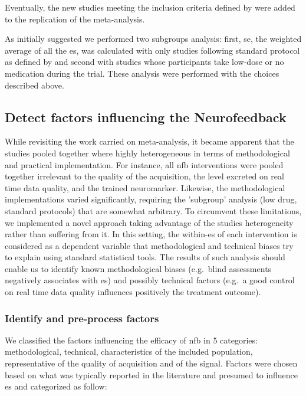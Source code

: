 Eventually, the new studies meeting the inclusion criteria defined by \citeauthor{Cortese2016} were added to the replication of the meta-analysis. 

As initially suggested we performed two subgroups analysis: first, \gls{se}, the weighted average of all the \gls{es}, was calculated with only studies following 
standard protocol as defined by \citet{Arns2014} and second with studies whose participants take low-dose or no medication during the trial. 
These analysis were performed with the choices described above. 

\subsection{Detect factors influencing the Neurofeedback}

While revisiting the work carried on meta-analysis, it became apparent that the studies pooled together where highly heterogeneous 
in terms of methodological and practical implementation. For instance, all \gls{nfb} interventions were pooled together irrelevant to the 
quality of the acquisition, the level excreted on real time data quality, and the trained neuromarker. 
Likewise, the methodological implementations varied significantly, requiring the 'subgroup' analysis (low drug, standard protocols) 
that are somewhat arbitrary. To circumvent these limitations, we implemented a novel approach taking advantage of the studies heterogeneity 
rather than suffering from it. In this setting, the within-\gls{es} of each intervention is considered as a dependent variable that
methodological and technical biases try to explain using standard statistical tools. The results of such analysis should enable us to identify 
known methodological biases (e.g.\ blind assessments negatively associates with \gls{es}) 
and possibly technical factors (e.g.\ a good control on real time data quality influences positively the treatment outcome). 

\subsubsection{Identify and pre-process factors}

We classified the factors influencing the efficacy of \gls{nfb} in 5 categories: methodological, technical, characteristics of the included
population, representative of the quality of acquisition and of the signal. 
Factors were chosen based on what was typically reported in the literature and presumed to influence \gls{es} and categorized as follow:

